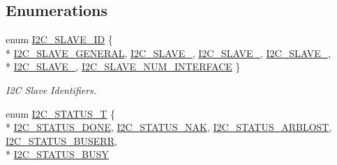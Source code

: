 \subsection*{Enumerations}
\begin{DoxyCompactItemize}
\item 
enum \hyperlink{group__I2C__17XX__40XX_ga5fb1ba338fb3822bb6ca012adc4194bf}{I2\-C\-\_\-\-S\-L\-A\-V\-E\-\_\-\-I\-D} \{ \\*
\hyperlink{group__I2C__17XX__40XX_gga5fb1ba338fb3822bb6ca012adc4194bfa7d2284af5f49b5b9df2582a31fff6370}{I2\-C\-\_\-\-S\-L\-A\-V\-E\-\_\-\-G\-E\-N\-E\-R\-A\-L}, 
\hyperlink{group__I2C__17XX__40XX_gga5fb1ba338fb3822bb6ca012adc4194bfad17f6d6b2d217b84307c502108a6fed6}{I2\-C\-\_\-\-S\-L\-A\-V\-E\-\_}, 
\hyperlink{group__I2C__17XX__40XX_gga5fb1ba338fb3822bb6ca012adc4194bfa8a4d6db2156bad4cf8c21226be564fe2}{I2\-C\-\_\-\-S\-L\-A\-V\-E\-\_}, 
\hyperlink{group__I2C__17XX__40XX_gga5fb1ba338fb3822bb6ca012adc4194bfab6d7a585cfa1106eb290fa9f302c5783}{I2\-C\-\_\-\-S\-L\-A\-V\-E\-\_}, 
\\*
\hyperlink{group__I2C__17XX__40XX_gga5fb1ba338fb3822bb6ca012adc4194bfaf5cff98e9db3da7cc50edd21d3873efd}{I2\-C\-\_\-\-S\-L\-A\-V\-E\-\_}, 
\hyperlink{group__I2C__17XX__40XX_gga5fb1ba338fb3822bb6ca012adc4194bfabdb0d442b75f2dbdb63aed5a307de077}{I2\-C\-\_\-\-S\-L\-A\-V\-E\-\_\-\-N\-U\-M\-\_\-\-I\-N\-T\-E\-R\-F\-A\-C\-E}
 \}
\begin{DoxyCompactList}\small\item\em I2\-C Slave Identifiers. \end{DoxyCompactList}\item 
enum \hyperlink{group__I2C__17XX__40XX_ga21aa839302786105dcf6a96be0e6e8bc}{I2\-C\-\_\-\-S\-T\-A\-T\-U\-S\-\_\-\-T} \{ \\*
\hyperlink{group__I2C__17XX__40XX_gga21aa839302786105dcf6a96be0e6e8bca9f5024a35710b260041d351d794afa9a}{I2\-C\-\_\-\-S\-T\-A\-T\-U\-S\-\_\-\-D\-O\-N\-E}, 
\hyperlink{group__I2C__17XX__40XX_gga21aa839302786105dcf6a96be0e6e8bcac41be4d0689494327d4dae20504c854d}{I2\-C\-\_\-\-S\-T\-A\-T\-U\-S\-\_\-\-N\-A\-K}, 
\hyperlink{group__I2C__17XX__40XX_gga21aa839302786105dcf6a96be0e6e8bca674732e92811621ed2ca34b9e40ca724}{I2\-C\-\_\-\-S\-T\-A\-T\-U\-S\-\_\-\-A\-R\-B\-L\-O\-S\-T}, 
\hyperlink{group__I2C__17XX__40XX_gga21aa839302786105dcf6a96be0e6e8bca803d8563e2b11514ba4549763ad441f5}{I2\-C\-\_\-\-S\-T\-A\-T\-U\-S\-\_\-\-B\-U\-S\-E\-R\-R}, 
\\*
\hyperlink{group__I2C__17XX__40XX_gga21aa839302786105dcf6a96be0e6e8bcab3dd2c4a10e92ca1a5cb580501bad817}{I2\-C\-\_\-\-S\-T\-A\-T\-U\-S\-\_\-\-B\-U\-S\-Y}

\end{DoxyCompactItemize}
